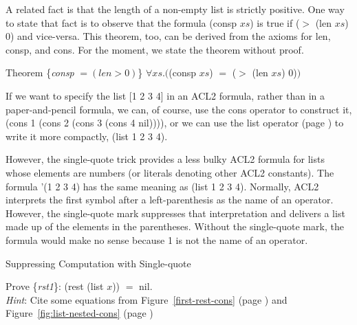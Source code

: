 A related fact is that the length of a non-empty list is strictly positive.
One way to state that fact is to observe that the formula \textsf{(consp $xs$)} is true
if \textsf{($>$ (len $xs$) 0)} and vice-versa. %
This theorem, too, can be derived from the axioms for
\textsf{len}, \textsf{consp}, and \textsf{cons}.
For the moment, we state the theorem without proof.
\begin{samepage}
\label{consp-len-thm}
\begin{center}
Theorem \{\emph{consp} $= (len > 0)$\} $\forall xs.($\textsf{(consp $xs$)} $=$ \textsf{($>$ (len $xs$) 0)}$)$
\end{center}
\end{samepage}

\begin{aside}
If we want to specify the list \textsf{[1 2 3 4]} in an ACL2 formula,
rather than in a paper-and-pencil formula,
we can, of course, use the \textsf{cons} operator to construct it,
\textsf{(cons 1 (cons 2 (cons 3 (cons 4 nil))))},
or we can use the \textsf{list} operator (page \pageref{list-op-informal}) to write it more compactly,
\textsf{(list 1 2 3 4)}.

However, the single-quote trick provides a less bulky ACL2 formula for lists
whose elements are numbers (or literals denoting other ACL2 constants).
The formula
\textsf{'(1 2 3 4)} has the same meaning as \textsf{(list 1 2 3 4)}.
Normally, ACL2 interprets the first symbol after a left-parenthesis
as the name of an operator.
However, the single-quote mark suppresses that interpretation and
delivers a list made up of the elements in the parentheses.
Without the single-quote mark,
the formula would make no sense because 1 is not the name of an operator.
\caption{Suppressing Computation with Single-quote}
\label{acl2-single-quote}
\end{aside}

\begin{ExerciseList}
\Exercise \label{rst1}
Prove \{\emph{rst1}\}: \textsf{(rest (list $x$))} $=$ \textsf{nil}.\\
\emph{Hint}: Cite some equations from Figure~\ref{first-rest-cons} (page \pageref{first-rest-cons})
and Figure~\ref{fig:list-nested-cons} (page \pageref{fig:list-nested-cons})
\end{ExerciseList}


